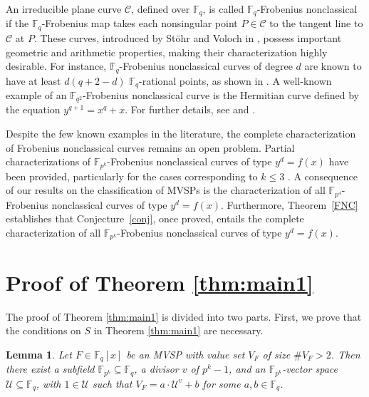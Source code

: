\documentclass[11pt]{amsart}
\newcommand{\F}{\mathbb{F}}
\newtheorem{lemma}[theorem]{Lemma}
\theoremstyle{definition}
\theoremstyle{remark}
\begin{document}
An irreducible plane curve $\mathcal{C}$, defined over $\mathbb{F}_q$, is called $\mathbb{F}_q$-Frobenius nonclassical if the $\mathbb{F}_q$-Frobenius map takes each nonsingular point $P \in \mathcal{C}$ to the tangent line to $\mathcal{C}$ at $P$. These curves, introduced by St\"ohr and Voloch in \cite{SV}, possess important geometric and arithmetic properties, making their characterization highly desirable. For instance, $\mathbb{F}_q$-Frobenius nonclassical curves of degree $d$ are known to have at least $d( q+2 - d)$ $\mathbb{F}_q$-rational points, as shown in \cite[Theorem 1.3]{BoHo}. A well-known example of an $\mathbb{F}_{q^2}$-Frobenius nonclassical curve is the Hermitian curve defined by the equation $y^{q+1} = x^q + x$. For further details, see \cite[Chapter 8]{HKT} and \cite{SV}.

Despite the few known examples in the literature, the complete characterization of Frobenius nonclassical curves remains an open problem. Partial characterizations of $\mathbb{F}_{p^k}$-Frobenius nonclassical curves of type  $y^d = f(x)$ have been provided,  particularly for the cases corresponding to $k \leq 3$ \cite{Bor0, BR, Garcia}. A consequence of our  results  on the classification of MVSPs is the characterization of  all $\mathbb{F}_{p^4}$-Frobenius nonclassical curves  of type  $y^d = f(x)$.  Furthermore,  Theorem~\ref{FNC} establishes that 
Conjecture~\ref{conj}, once   proved,  entails   the  complete characterization of all $\mathbb{F}_{p^k}$-Frobenius nonclassical curves  of type  $y^d = f(x)$. 

\section{Proof of Theorem \ref{thm:main1}}

The proof of Theorem  \ref{thm:main1}  is divided into two parts. First, we prove that the conditions on $S$ in Theorem  \ref{thm:main1} are necessary.




\begin{lemma}\label{cor:vec}
Let $F\in \F_q[x]$ be an MVSP  with value set $V_F$ of size $\# V_F>2$. Then there exist a subfield $\F_{p^k}\subseteq \F_q$, a divisor $v$ of $p^k-1$, and an $\F_{p^k}$-vector space $\mathcal U\subseteq \F_q$, with $1 \in\mathcal U$  such that $V_F=a\cdot \mathcal U^v+b$ for some $a, b\in\F_q$.

\end{lemma}
\end{document}
